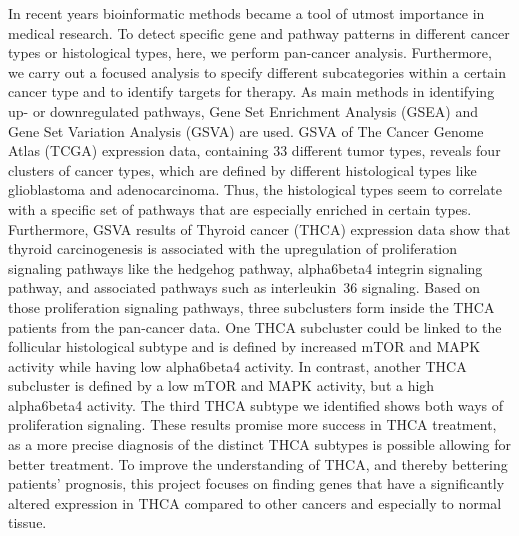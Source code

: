 \documentclass[
  11pt,
  parskip,
  oneside]{scrreprt}
\begin{document}
In recent years bioinformatic methods became a tool of utmost importance
in medical research. To detect specific gene and pathway patterns in
different cancer types or histological types, here, we perform
pan-cancer analysis. Furthermore, we carry out a focused analysis to
specify different subcategories within a certain cancer type and to
identify targets for therapy. As main methods in identifying up- or
downregulated pathways, Gene Set Enrichment Analysis (GSEA) and Gene Set
Variation Analysis (GSVA) are used. GSVA of The Cancer Genome Atlas
(TCGA) expression data, containing 33 different tumor types, reveals
four clusters of cancer types, which are defined by different
histological types like glioblastoma and adenocarcinoma. Thus, the
histological types seem to correlate with a specific set of pathways
that are especially enriched in certain types. Furthermore, GSVA results
of Thyroid cancer (THCA) expression data show that thyroid
carcinogenesis is associated with the upregulation of proliferation
signaling pathways like the hedgehog pathway, alpha6beta4 integrin
signaling pathway, and associated pathways such as interleukin~36
signaling. Based on those proliferation signaling pathways, three
subclusters form inside the THCA patients from the pan-cancer data. One
THCA subcluster could be linked to the follicular histological subtype
and is defined by increased mTOR and MAPK activity while having low
alpha6beta4 activity. In contrast, another THCA subcluster is defined by
a low mTOR and MAPK activity, but a high alpha6beta4 activity. The third
THCA subtype we identified shows both ways of proliferation signaling.
These results promise more success in THCA treatment, as a more precise
diagnosis of the distinct THCA subtypes is possible allowing for better
treatment. To improve the understanding of THCA, and thereby bettering
patients' prognosis, this project focuses on finding genes that have a
significantly altered expression in THCA compared to other cancers and
especially to normal tissue. \clearpage

\end{document}

